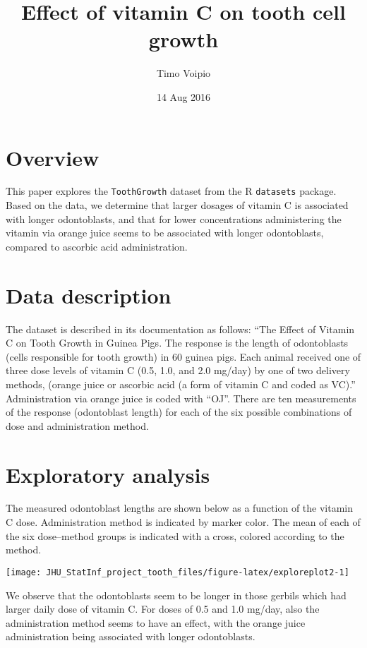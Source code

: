 \documentclass[a4paper]{article}
\title{Effect of vitamin C on tooth cell growth}
\author{Timo Voipio}
\date{14 Aug 2016}
\begin{document}
\maketitle

\section{Overview}\label{overview}

This paper explores the \texttt{ToothGrowth} dataset from the R
\texttt{datasets} package. Based on the data, we determine that larger
dosages of vitamin C is associated with longer odontoblasts, and that
for lower concentrations administering the vitamin via orange juice
seems to be associated with longer odontoblasts, compared to ascorbic
acid administration.

\section{Data description}\label{data-description}

The dataset is described in its documentation as follows: ``The Effect
of Vitamin C on Tooth Growth in Guinea Pigs. The response is the length
of odontoblasts (cells responsible for tooth growth) in 60 guinea pigs.
Each animal received one of three dose levels of vitamin C (0.5, 1.0,
and 2.0 mg/day) by one of two delivery methods, (orange juice or
ascorbic acid (a form of vitamin C and coded as VC).'' Administration
via orange juice is coded with ``OJ''. There are ten measurements of the
response (odontoblast length) for each of the six possible combinations
of dose and administration method.

\section{Exploratory analysis}\label{exploratory-analysis}

The measured odontoblast lengths are shown below as a function of the
vitamin C dose. Administration method is indicated by marker color. The
mean of each of the six dose--method groups is indicated with a cross,
colored according to the method.

\begin{center}\texttt{[image: JHU\_StatInf\_project\_tooth\_files/figure-latex/exploreplot2-1]} \end{center}

We observe that the odontoblasts seem to be longer in those gerbils
which had larger daily dose of vitamin C. For doses of 0.5 and 1.0
mg/day, also the administration method seems to have an effect, with the
orange juice administration being associated with longer odontoblasts.
\end{document}
